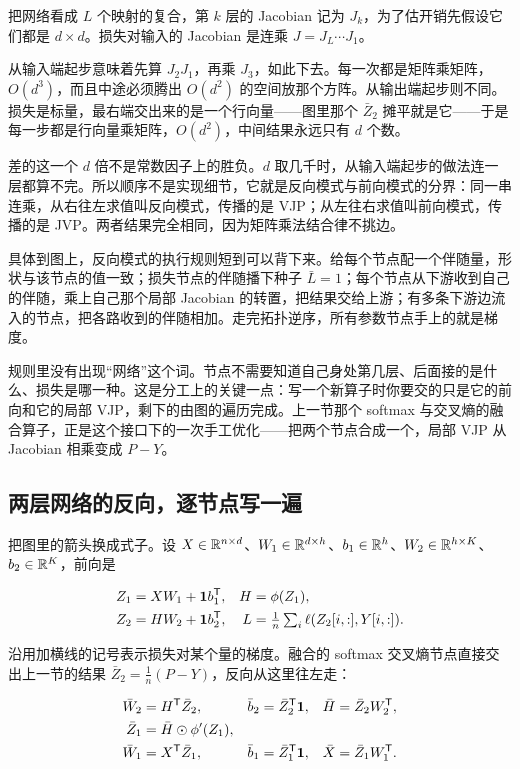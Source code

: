 把网络看成 \(L\) 个映射的复合，第 \(k\) 层的 Jacobian 记为 \(J_k\)，为了估开销先假设它们都是 \(d\times d\)。损失对输入的 Jacobian 是连乘 \(J=J_L\cdots J_1\)。

从输入端起步意味着先算 \(J_2J_1\)，再乘 \(J_3\)，如此下去。每一次都是矩阵乘矩阵，\(O(d^3)\)，而且中途必须腾出 \(O(d^2)\) 的空间放那个方阵。从输出端起步则不同。损失是标量，最右端交出来的是一个行向量——图里那个 \(\bar Z_2\) 摊平就是它——于是每一步都是行向量乘矩阵，\(O(d^2)\)，中间结果永远只有 \(d\) 个数。

差的这一个 \(d\) 倍不是常数因子上的胜负。\(d\) 取几千时，从输入端起步的做法连一层都算不完。所以顺序不是实现细节，它就是反向模式与前向模式的分界：同一串连乘，从右往左求值叫反向模式，传播的是 VJP；从左往右求值叫前向模式，传播的是 JVP。两者结果完全相同，因为矩阵乘法结合律不挑边。

具体到图上，反向模式的执行规则短到可以背下来。给每个节点配一个伴随量，形状与该节点的值一致；损失节点的伴随播下种子 \(\bar L=1\)；每个节点从下游收到自己的伴随，乘上自己那个局部 Jacobian 的转置，把结果交给上游；有多条下游边流入的节点，把各路收到的伴随相加。走完拓扑逆序，所有参数节点手上的就是梯度。

规则里没有出现``网络''这个词。节点不需要知道自己身处第几层、后面接的是什么、损失是哪一种。这是分工上的关键一点：写一个新算子时你要交的只是它的前向和它的局部 VJP，剩下的由图的遍历完成。上一节那个 softmax 与交叉熵的融合算子，正是这个接口下的一次手工优化——把两个节点合成一个，局部 VJP 从 Jacobian 相乘变成 \(P-Y\)。

\subsection{两层网络的反向，逐节点写一遍}

把图里的箭头换成式子。设 \(X\in\mathbb{R}^{n\times d}\)、\(W_1\in\mathbb{R}^{d\times h}\)、\(b_1\in\mathbb{R}^h\)、\(W_2\in\mathbb{R}^{h\times K}\)、\(b_2\in\mathbb{R}^K\)，前向是

\[
\begin{aligned}
Z_1&=XW_1+\mathbf1b_1^{\mathsf{T}}, &\space H&=\phi(Z_1),\\
Z_2&=HW_2+\mathbf1b_2^{\mathsf{T}}, &\space L&=\tfrac1n\textstyle\sum\nolimits_i\ell(Z_2[i,:],Y[i,:]).
\end{aligned}
\]

沿用加横线的记号表示损失对某个量的梯度。融合的 softmax 交叉熵节点直接交出上一节的结果 \(\bar Z_2=\frac1n(P-Y)\)，反向从这里往左走：

\[
\begin{aligned}
\bar W_2&=H^{\mathsf{T}}\bar Z_2, &\space \bar b_2&=\bar Z_2^{\mathsf{T}}\mathbf1, &\space \bar H&=\bar Z_2W_2^{\mathsf{T}},\\
\bar Z_1&=\bar H\odot\phi'(Z_1), &&&&\\
\bar W_1&=X^{\mathsf{T}}\bar Z_1, &\space \bar b_1&=\bar Z_1^{\mathsf{T}}\mathbf1, &\space \bar X&=\bar Z_1W_1^{\mathsf{T}}.
\end{aligned}
\]

